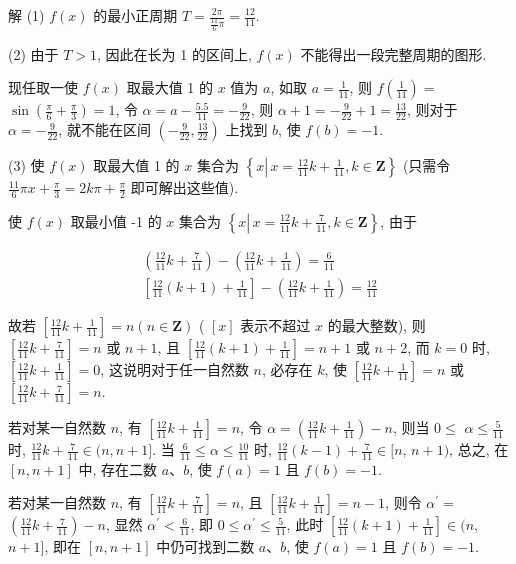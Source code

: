 	解 (1) $f(x)$ 的最小正周期 $T=\frac{2 \pi}{\frac{11}{6} \pi}=\frac{12}{11}$.

	(2) 由于 $T>1$, 因此在长为 1 的区间上, $f(x)$ 不能得出一段完整周期的图形.

	现任取一使 $f(x)$ 取最大值 1 的 $x$ 值为 $a$, 如取 $a=\frac{1}{11}$, 则 $f\left(\frac{1}{11}\right)=$ $\sin \left(\frac{\pi}{6}+\frac{\pi}{3}\right)=1$, 令 $\alpha=a-\frac{5.5}{11}=-\frac{9}{22}$, 则 $\alpha+1=-\frac{9}{22}+1=\frac{13}{22}$, 则对于 $\alpha=-\frac{9}{22}$, 就不能在区间 $\left(-\frac{9}{22}, \frac{13}{22}\right)$ 上找到 $b$, 使 $f(b)=-1$.

	(3) 使 $f(x)$ 取最大值 1 的 $x$ 集合为 $\left\{x \left\lvert\, x=\frac{12}{11} k+\frac{1}{11}\right., k \in \mathbf{Z}\right\}$ (只需令 $\frac{11}{6} \pi x+\frac{\pi}{3}=2 k \pi+\frac{\pi}{2}$ 即可解出这些值).

	使 $f(x)$ 取最小值 -1 的 $x$ 集合为 $\left\{x \left\lvert\, x=\frac{12}{11} k+\frac{7}{11}\right., k \in \mathbf{Z}\right\}$, 由于

	$$
		\begin{gathered}
			\left(\frac{12}{11} k+\frac{7}{11}\right)-\left(\frac{12}{11} k+\frac{1}{11}\right)=\frac{6}{11} \\
			{\left[\frac{12}{11}(k+1)+\frac{1}{11}\right]-\left(\frac{12}{11} k+\frac{1}{11}\right)=\frac{12}{11}}
		\end{gathered}
	$$

	故若 $\left[\frac{12}{11} k+\frac{1}{11}\right]=n(n \in \mathbf{Z})$ ( $[x]$ 表示不超过 $x$ 的最大整数), 则 $\left[\frac{12}{11} k+\frac{7}{11}\right]=n$ 或 $n+1$, 且 $\left[\frac{12}{11}(k+1)+\frac{1}{11}\right]=n+1$ 或 $n+2$, 而 $k=0$ 时, $\left[\frac{12}{11} k+\frac{1}{11}\right]=0$, 这说明对于任一自然数 $n$, 必存在 $k$, 使 $\left[\frac{12}{11} k+\frac{1}{11}\right]=n$ 或 $\left[\frac{12}{11} k+\frac{7}{11}\right]=n$.

	若对某一自然数 $n$, 有 $\left[\frac{12}{11} k+\frac{1}{11}\right]=n$, 令 $\alpha=\left(\frac{12}{11} k+\frac{1}{11}\right)-n$, 则当 $0 \leqslant$ $\alpha \leqslant \frac{5}{11}$ 时, $\frac{12}{11} k+\frac{7}{11} \in(n, n+1]$. 当 $\frac{6}{11} \leqslant \alpha \leqslant \frac{10}{11}$ 时, $\frac{12}{11}(k-1)+\frac{7}{11} \in[n$, $n+1)$, 总之, 在 $[n, n+1]$ 中, 存在二数 $a 、 b$, 使 $f(a)=1$ 且 $f(b)=-1$.

	若对某一自然数 $n$, 有 $\left[\frac{12}{11} k+\frac{7}{11}\right]=n$, 且 $\left[\frac{12}{11} k+\frac{1}{11}\right]=n-1$, 则令 $\alpha^{\prime}=$ $\left(\frac{12}{11} k+\frac{7}{11}\right)-n$, 显然 $\alpha^{\prime}<\frac{6}{11}$, 即 $0 \leqslant \alpha^{\prime} \leqslant \frac{5}{11}$, 此时 $\left[\frac{12}{11}(k+1)+\frac{1}{11}\right] \in(n$, $n+1]$, 即在 $[n, n+1]$ 中仍可找到二数 $a 、 b$, 使 $f(a)=1$ 且 $f(b)=-1$.

